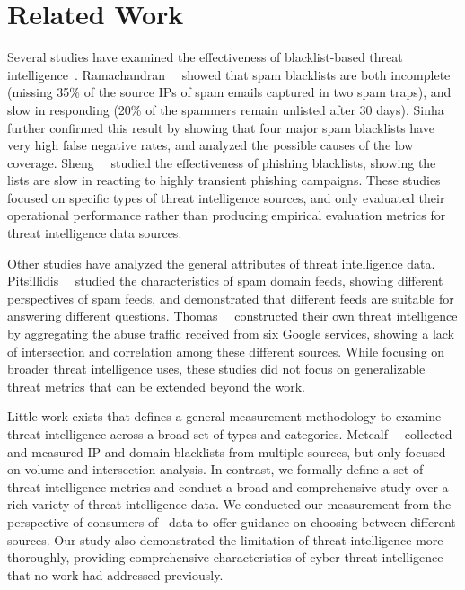 \section{Related Work}
\label{sec:background}

Several studies have examined the effectiveness of blacklist-based threat
intelligence~\cite{kuhrer2014paint, ramachandran2006revealing, ramachandran2007filtering, sheng2009empirical, sinha2008shades}.
Ramachandran~\etal~\cite{ramachandran2007filtering} showed that spam blacklists
are both incomplete (missing 35\% of the source IPs of spam emails captured in
two spam traps), and slow in responding (20\% of the spammers remain unlisted
after 30 days). Sinha~\etal~\cite{sinha2008shades} further confirmed this
result by showing that four major spam blacklists have very high false negative
rates, and analyzed the possible causes of the low coverage.
Sheng~\etal~\cite{sheng2009empirical} studied the effectiveness of
phishing blacklists, showing the lists are slow in reacting to
highly transient phishing campaigns. These studies focused on specific
types of threat intelligence sources, and only evaluated their operational
performance rather than producing empirical evaluation metrics for
threat intelligence data sources.

Other studies have analyzed the general attributes of threat
intelligence data.  Pitsillidis~\etal~\cite{tasters:imc12} studied the
characteristics of spam domain feeds, showing different perspectives
of spam feeds, and demonstrated that different feeds are suitable for
answering different questions.  Thomas~\etal~\cite{thomas2016abuse}
constructed their own threat intelligence by aggregating the abuse
traffic received from six Google services, showing a lack of
intersection and correlation among these different sources.  While
focusing on broader threat intelligence uses, these studies did not
focus on generalizable threat metrics that can be extended beyond the work.

Little work exists that defines a general measurement methodology to
examine threat intelligence across a broad set of types and categories.
Metcalf~\etal~\cite{metcalf2015blacklist} collected and measured IP
and domain blacklists from multiple sources, but only focused on volume
and intersection analysis. In contrast, we formally define a set of threat intelligence
metrics and conduct a broad and comprehensive study over a rich variety of
threat intelligence data. We conducted our measurement from the
perspective of consumers of \ti\ data
to offer guidance on choosing between different sources.
Our study also demonstrated the limitation of threat intelligence more thoroughly,
providing comprehensive characteristics of cyber threat intelligence that no work had
addressed previously.
